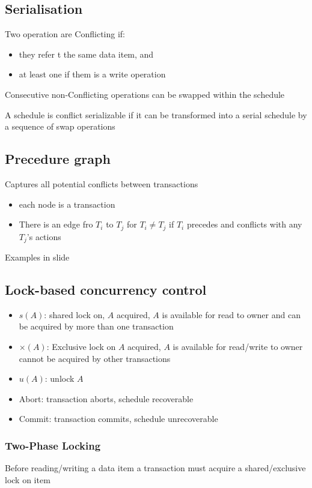 \documentclass{article}
\begin{document}
\subsection{Serialisation}
Two operation are Conflicting if:
\begin{itemize}
  \item they refer t the same data item, and
  \item at least one if them is a write operation
\end{itemize}

Consecutive non-Conflicting operations can be swapped within the schedule

A schedule is conflict serializable if it can be transformed into a serial schedule by a sequence of swap operations

\subsection{Precedure graph}
Captures all potential conflicts between transactions
\begin{itemize}
  \item each node is a transaction
  \item There is an edge fro $T_i$ to $T_j$ for $T_i \neq T_j$ if $T_i$ precedes and conflicts with any $T_j$'s actions
\end{itemize}
Examples in slide

\subsection{Lock-based concurrency control}
\begin{itemize}
  \item $s(A)$: shared lock on, $A$ acquired, $A$ is available for read to owner and can be acquired by more than one transaction
  \item $\times(A)$: Exclusive lock on $A$ acquired, $A$ is available for read/write to owner cannot be acquired by other transactions
  \item $u(A)$: unlock  $A$
  \item Abort: transaction aborts, schedule recoverable
  \item Commit: transaction commits, schedule unrecoverable
\end{itemize}

\subsubsection*{Two-Phase Locking}
Before reading/writing a data item a transaction must acquire a shared/exclusive lock on item
\end{document}
